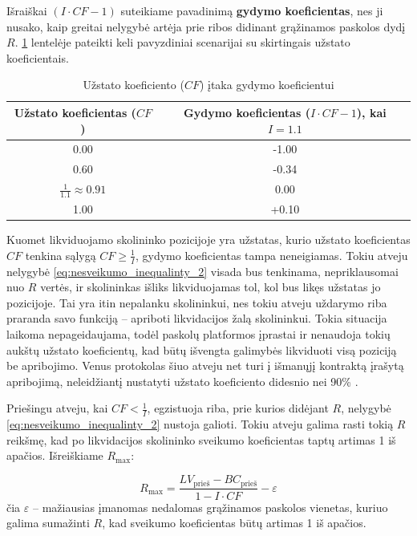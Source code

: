 \documentclass[]{VUMIFTemplateClass}
\begin{document}
Išraiškai $(I \cdot CF - 1)$ suteikiame pavadinimą \textbf{gydymo koeficientas}, nes ji nusako, kaip greitai nelygybė artėja prie ribos didinant grąžinamos paskolos dydį $R$. \ref{tab:cf_scenarijai} lentelėje pateikti keli pavyzdiniai scenarijai su skirtingais užstato koeficientais.

\begin{table}[H]
    \centering
    \caption{Užstato koeficiento ($CF$) įtaka gydymo koeficientui}
    \begin{tabular}{|c|c|}
        \hline
        \textbf{Užstato koeficientas ($CF$)} & \textbf{Gydymo koeficientas ($I \cdot CF - 1$), kai $I=1.1$} \\
        \hline
        0.00 & -1.00 \\
        0.60 & -0.34 \\
        $\frac{1}{1.1} \approx 0.91$ & 0.00 \\
        1.00 & +0.10 \\
        \hline
    \end{tabular}
    \label{tab:cf_scenarijai}
\end{table}

Kuomet likviduojamo skolininko pozicijoje yra užstatas, kurio užstato koeficientas $CF$ tenkina sąlygą $CF \geq \frac{1}{I}$, gydymo koeficientas tampa neneigiamas. Tokiu atveju nelygybė \ref{eq:nesveikumo_inequalinty_2} visada bus tenkinama, nepriklausomai nuo $R$ vertės, ir skolininkas išliks likviduojamas tol, kol bus likęs užstatas jo pozicijoje. Tai yra itin nepalanku skolininkui, nes tokiu atveju uždarymo riba praranda savo funkciją – apriboti likvidacijos žalą skolininkui. Tokia situacija laikoma nepageidaujama, todėl paskolų platformos įprastai ir nenaudoja tokių aukštų užstato koeficientų, kad būtų išvengta galimybės likviduoti visą poziciją be apribojimo.  Venus protokolas šiuo atveju net turi į išmanųjį kontraktą įrašytą apribojimą, neleidžiantį nustatyti užstato koeficiento didesnio nei 90\% \cite{venusmaxcf}.

Priešingu atveju, kai $CF < \frac{1}{I}$, egzistuoja riba, prie kurios didėjant $R$, nelygybė \ref{eq:nesveikumo_inequalinty_2} nustoja galioti. Tokiu atveju galima rasti tokią $R$ reikšmę, kad po likvidacijos skolininko sveikumo koeficientas taptų artimas 1 iš apačios. 
Išreiškiame $R_{\text{max}}$:

\begin{equation}
    R_{\text{max}} = \frac{LV_{\text{prieš}} - BC_{\text{prieš}}}{1 - I \cdot CF} - \varepsilon
    \label{eq:max_R}
\end{equation}
čia $\varepsilon$ – mažiausias įmanomas nedalomas grąžinamos paskolos vienetas, kuriuo galima sumažinti $R$, kad sveikumo koeficientas būtų artimas 1 iš apačios.
\end{document}
